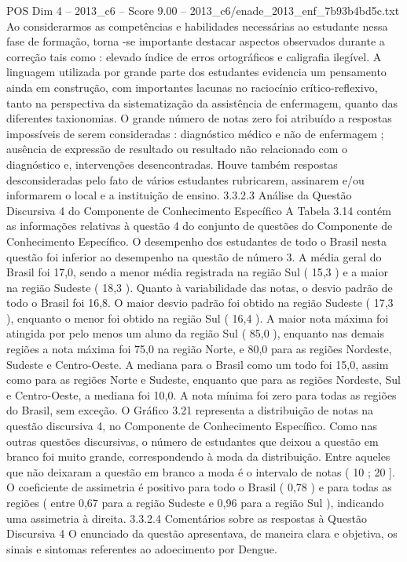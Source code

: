 \begin{textsample}{POS Dim 4 – 2013\_c6 – Score 9.00 – 2013\_c6/enade\_2013\_enf\_7b93b4bd5c.txt}
Ao considerarmos as competências e habilidades necessárias ao estudante nessa fase de formação, torna -se importante destacar aspectos observados durante a correção tais como : elevado índice de erros ortográficos e caligrafia ilegível.
A linguagem utilizada por grande parte dos estudantes evidencia um pensamento ainda em construção, com importantes lacunas no raciocínio crítico-reflexivo, tanto na perspectiva da sistematização da assistência de enfermagem, quanto das diferentes taxionomias.
O grande número de notas zero foi atribuído a respostas impossíveis de serem consideradas : diagnóstico médico e não de enfermagem ; ausência de expressão de resultado ou resultado não relacionado com o diagnóstico e, intervenções desencontradas.
Houve também respostas desconsideradas pelo fato de vários estudantes rubricarem, assinarem e/ou informarem o local e a instituição de ensino. 3.3.2.3 Análise da Questão Discursiva 4 do Componente de Conhecimento Específico A Tabela 3.14 contém as informações relativas à questão 4 do conjunto de questões do Componente de Conhecimento Específico.
O desempenho dos estudantes de todo o Brasil nesta questão foi inferior ao desempenho na questão de número 3.
A média geral do Brasil foi 17,0, sendo a menor média registrada na região Sul ( 15,3 ) e a maior na região Sudeste ( 18,3 ).
Quanto à variabilidade das notas, o desvio padrão de todo o Brasil foi 16,8.
O maior desvio padrão foi obtido na região Sudeste ( 17,3 ), enquanto o menor foi obtido na região Sul ( 16,4 ).
A maior nota máxima foi atingida por pelo menos um aluno da região Sul ( 85,0 ), enquanto nas demais regiões a nota máxima foi 75,0 na região Norte, e 80,0 para as regiões Nordeste, Sudeste e Centro-Oeste.
A mediana para o Brasil como um todo foi 15,0, assim como para as regiões Norte e Sudeste, enquanto que para as regiões Nordeste, Sul e Centro-Oeste, a mediana foi 10,0.
A nota mínima foi zero para todas as regiões do Brasil, sem exceção.
O Gráfico 3.21 representa a distribuição de notas na questão discursiva 4, no Componente de Conhecimento Específico.
Como nas outras questões discursivas, o número de estudantes que deixou a questão em branco foi muito grande, correspondendo à moda da distribuição.
Entre aqueles que não deixaram a questão em branco a moda é o intervalo de notas ( 10 ; 20 ].
O coeficiente de assimetria é positivo para todo o Brasil ( 0,78 ) e para todas as regiões ( entre 0,67 para a região Sudeste e 0,96 para a região Sul ), indicando uma assimetria à direita. 3.3.2.4 Comentários sobre as respostas à Questão Discursiva 4 O enunciado da questão apresentava, de maneira clara e objetiva, os sinais e sintomas referentes ao adoecimento por Dengue.

\end{textsample}
